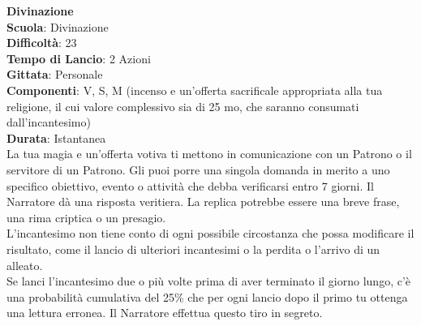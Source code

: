 \begin{multicols}{2}
\medskip\textbf{Divinazione}\\
\textbf{Scuola}: Divinazione\\
\textbf{Difficoltà}: 23\\
\textbf{Tempo di Lancio}: 2 Azioni\\
\textbf{Gittata}: Personale\\
\textbf{Componenti}: V, S, M (incenso e un'offerta sacrificale appropriata alla tua religione, il cui valore complessivo sia di 25 mo, che saranno consumati dall'incantesimo)\\
\textbf{Durata}: Istantanea\\
La tua magia e un'offerta votiva ti mettono in comunicazione con un Patrono o il servitore di un Patrono. Gli puoi porre una singola domanda in merito a uno specifico obiettivo, evento o attività che debba verificarsi entro 7 giorni. Il Narratore dà una risposta veritiera. La replica potrebbe essere una breve frase, una rima criptica o un presagio. \\
L'incantesimo non tiene conto di ogni possibile circostanza che possa modificare il risultato, come il lancio di ulteriori incantesimi o la perdita o l'arrivo di un alleato.\\
Se lanci l'incantesimo due o più volte prima di aver terminato il giorno lungo, c'è una probabilità cumulativa del 25\% che per ogni lancio dopo il primo tu ottenga una lettura erronea. Il Narratore effettua questo tiro in segreto. 


\end{multicols}
